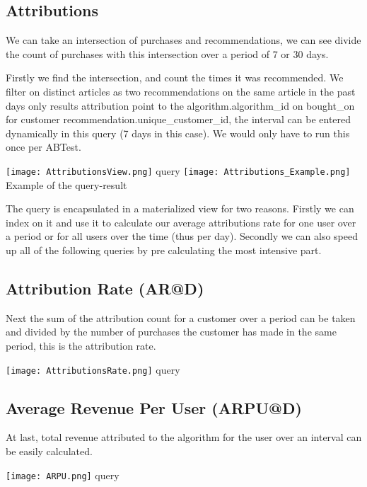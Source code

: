 \documentclass[a4paper,12pt]{article}
\begin{document}
\subsection{Attributions} 
\begin{spverbatim}
We can take an intersection of purchases and recommendations, we can see divide the count of purchases with this intersection over a period of 7 or 30 days.

Firstly we find the intersection, and count the times it was recommended. We filter on distinct articles as two recommendations on the same article in the past days only results attribution point to the algorithm.algorithm_id on bought_on for customer recommendation.unique_customer_id, the interval can be entered dynamically in this query (7 days in this case). We would only have to run this once per ABTest.


\end{spverbatim}
		\begin{center}
		  		\texttt{[image: AttributionsView.png]}
		  		query
		  		\texttt{[image: Attributions\_Example.png]}
		  		Example of the query-result
	\end{center}
\begin{spverbatim}
The query is encapsulated in a materialized view for two reasons. Firstly we can index on it and use it to calculate our average attributions rate for one user over a period or for all users over the time (thus per day). Secondly we can also speed up all of the following queries by pre calculating the most intensive part.


\end{spverbatim}
\subsection{Attribution Rate (AR@D)} 
Next the sum of the attribution count for a customer over a period can be taken and divided by the number of purchases the customer has made in the same period, this is the attribution rate.


		\begin{center}
		  		\texttt{[image: AttributionsRate.png]}
		  		query
	\end{center}
\subsection{Average Revenue Per User (ARPU@D)}
At last, total revenue attributed to the algorithm for the user over an interval can be easily calculated.

		\begin{center}
		  		\texttt{[image: ARPU.png]}
		  		query
\end{center}
\end{document}
